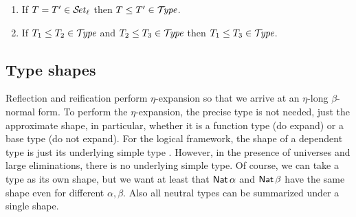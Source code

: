 \documentclass[acmsmall,screen]{acmart}\settopmatter{}
\begin{document}
\begin{lemma}
\label{lem:preord}
\bla
\begin{enumerate}
\item If\/ $T = T' \in \SET[\ell]$ then $T \leq T' \in \TYPE$.
\item If\/ $T_1 \leq T_2 \in \TYPE$ and $T_2 \leq T_3 \in \TYPE$ then $T_1 \leq T_3 \in \TYPE$.
\end{enumerate}
\end{lemma}





\subsection{Type shapes}
\label{sec:shape}

Reflection and reification perform $\eta$-expansion so that we arrive at an $\eta$-long $\beta$-normal form.  To perform the $\eta$-expansion, the precise type is not needed, just the approximate shape, in particular, whether it is a function type (do expand) or a base type (do not expand).
For the logical framework, the shape of a dependent type is just its
underlying simple type \cite{harperPfenning:equivalenceLF}. However,
in the presence of universes and large eliminations, there is no
underlying simple type.  Of course, we can take a type as its own
shape, but we want at least that $\Nat \alpha$ and $\Nat \beta$ have
the same shape even for different $\alpha, \beta$.
Also all neutral types can be summarized under a single shape.
\end{document}

